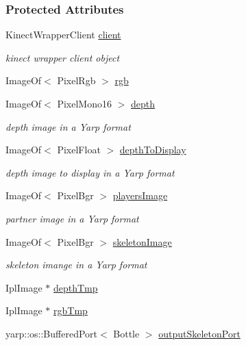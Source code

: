 \subsubsection*{Protected Attributes}
\begin{DoxyCompactItemize}
\item 
Kinect\+Wrapper\+Client \hyperlink{group__agentDetector_a2f5671fc2803530ccad5d6e46315f054}{client}
\begin{DoxyCompactList}\small\item\em kinect wrapper client object \end{DoxyCompactList}\item 
Image\+Of$<$ Pixel\+Rgb $>$ \hyperlink{group__agentDetector_a6dded50135450c781366c97ab9b81bd6}{rgb}
\item 
Image\+Of$<$ Pixel\+Mono16 $>$ \hyperlink{group__agentDetector_a3787f2b0cf6d213321d9590ac18b8958}{depth}
\begin{DoxyCompactList}\small\item\em depth image in a Yarp format \end{DoxyCompactList}\item 
Image\+Of$<$ Pixel\+Float $>$ \hyperlink{group__agentDetector_a24cfdd0522338cab6d61d8a172a9a6d2}{depth\+To\+Display}
\begin{DoxyCompactList}\small\item\em depth image to display in a Yarp format \end{DoxyCompactList}\item 
Image\+Of$<$ Pixel\+Bgr $>$ \hyperlink{group__agentDetector_aa9ec013e4af6845f699603cf3765630d}{players\+Image}
\begin{DoxyCompactList}\small\item\em partner image in a Yarp format \end{DoxyCompactList}\item 
Image\+Of$<$ Pixel\+Bgr $>$ \hyperlink{group__agentDetector_a9c2e8040860e91c499d63e805cbd6505}{skeleton\+Image}
\begin{DoxyCompactList}\small\item\em skeleton imange in a Yarp format \end{DoxyCompactList}\item 
Ipl\+Image $\ast$ \hyperlink{group__agentDetector_a87d602df434b454a1e0d727c4a1cafcb}{depth\+Tmp}
\item 
Ipl\+Image $\ast$ \hyperlink{group__agentDetector_a40598409523396516d85112512d7abb3}{rgb\+Tmp}
\item 
yarp\+::os\+::\+Buffered\+Port$<$ Bottle $>$ \hyperlink{group__agentDetector_aae49558e62e43aae0158f9bbd8fd49fe}{output\+Skeleton\+Port}

\end{DoxyCompactItemize}
